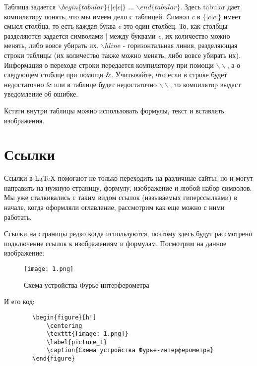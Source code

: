     Таблица задается $\backslash begin\{tabular\}\{|c|c|\}$ ... $\backslash end\{tabular\}$. Здесь tabular дает компилятору понять, что мы имеем дело с таблицей. Символ \textit{c} в $\{|c|c|\}$ имеет смысл столбца, то есть каждая буква \textit{c} это один столбец. То, как столбцы разделяются задается символами | между буквами \textit{c}, их количество можно менять, либо вовсе убирать их. $\backslash hline$ - горизонтальная линия, разделяющая строки таблицы (их количество также можно менять, либо вовсе убирать их). Информация о переходе строки передается компилятору при помощи $\backslash \backslash$, а о следующем стоблце при помощи $\&$. Учитывайте, что если в строке будет недостаточно $\&$ или в таблице будет недостаточно $\backslash \backslash$, то компилятор выдаст уведомление об ошибке.
    
    Кстати внутри таблицы можно использовать формулы, текст и вставлять изображения.
    
    \section{Ссылки}

    Ссылки в \LaTeX{} помогают не только переходить на различные сайты, но и могут направить на нужную страницу, формулу, изображение и любой набор символов. Мы уже сталкивались с таким видом ссылок (называемых гиперссылками) в начале, когда оформляли оглавление, рассмотрим как еще можно с ними работать.
    
    Ссылки на страницы редко когда используются, поэтому здесь будут рассмотрено подключение ссылок к изображениям и формулам. Посмотрим на данное изображение:

\newpage    
    
    \begin{figure}[h!]
        \centering
        \texttt{[image: 1.png]}
        \label{picture}
        \caption{Схема устройства Фурье-интерферометра}
    \end{figure}
    
    И его код:
    
    \begin{verbatim}
        \begin{figure}[h!]
            \centering
            \texttt{[image: 1.png]}
            \label{picture_1}
            \caption{Схема устройства Фурье-интерферометра}
        \end{figure}
    \end{verbatim}
    
